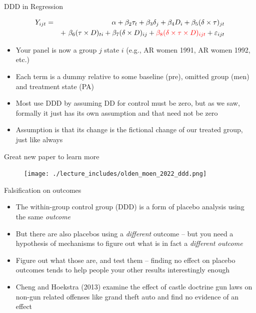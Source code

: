 \documentclass{beamer}
\begin{document}
\begin{frame}{DDD in Regression}
	
	\begin{eqnarray*}
	Y_{ijt} &=&\alpha +  \beta_2 \tau_t + \beta_3 \delta_j  + \beta_4 D_i + \beta_5(\delta \times \tau)_{jt} \\
	&& +\ \beta_6(\tau \times D)_{ti} +  \beta_7(\delta \times D)_{ij} +  \textcolor{red}{\beta_8(\delta \times \tau \times  D)_{ijt}}+  \varepsilon_{ijt}
	\end{eqnarray*}
	
	\begin{itemize}
	\item Your panel is now a group $j$ state $i$ (e.g., AR women 1991, AR women 1992, etc.)
	\item Each term is a dummy relative to some baseline (pre), omitted group (men) and treatment state (PA)
	\item Most use DDD by assuming DD for control must be zero, but as we saw, formally it just has its own assumption and that need not be zero
	\item Assumption is that its change is the fictional change of our treated group, just like always
		\end{itemize}
	
\end{frame}

\begin{frame}{Great new paper to learn more}

\begin{figure}
\texttt{[image: ./lecture\_includes/olden\_moen\_2022\_ddd.png]}
\end{figure}

\end{frame}




\begin{frame}{Falsification on outcomes}
	
	\begin{itemize}
	\item The within-group control group (DDD) is a form of placebo analysis using the same \emph{outcome}
	\item But there are also placebos using a \emph{different} outcome -- but you need a hypothesis of mechanisms to figure out what is in fact a \emph{different outcome}
	\item Figure out what those are, and test them -- finding no effect on placebo outcomes tends to help people your other results interestingly enough
	\item Cheng and Hoekstra (2013) examine the effect of castle doctrine gun laws on non-gun related offenses like grand theft auto and find no evidence of an effect 
	\end{itemize}
\end{frame}
\end{document}
